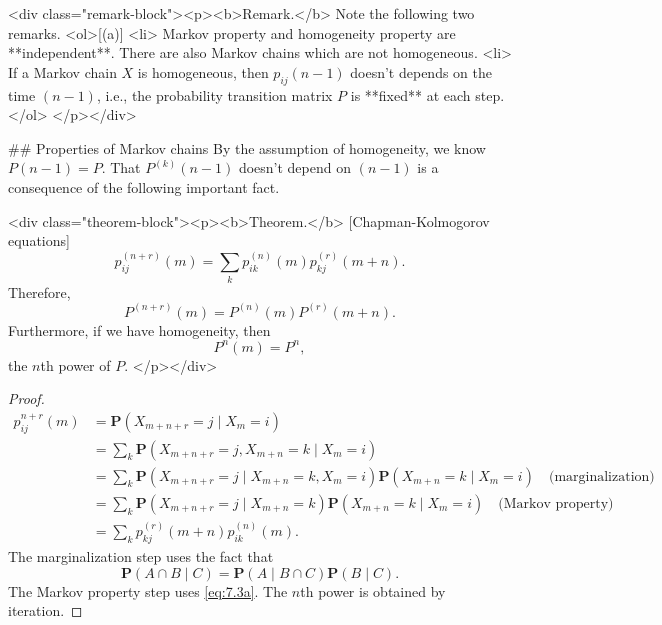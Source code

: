 <div class="remark-block"><p><b>Remark.</b> 
Note the following two remarks.
<ol>[(a)]
    <li> Markov property and homogeneity property are **independent**. There are also Markov chains which are not homogeneous. 
    <li> If a Markov chain $X$ is homogeneous, then $p_{ij}(n-1)$ doesn't depends on the time $(n-1)$, i.e., the probability transition matrix $P$ is **fixed** at each step.
</ol>
</p></div>

## Properties of Markov chains
By the assumption of homogeneity, we know $P(n-1) = P$. That $P^{(k)}(n-1)$ doesn't depend on $(n-1)$ is a consequence of the following important fact.

<div class="theorem-block"><p><b>Theorem.</b> [Chapman-Kolmogorov equations]
$$\begin{equation}
    p_{ij}^{(n+r)}(m) = \sum_{k} p_{ik}^{(n)}(m) p_{kj}^{(r)}(m+n).
\end{equation}$$
Therefore, 
$$\begin{equation}
    P^{(n+r)}(m) = P^{(n)}(m) P^{(r)}(m+n).
\end{equation}$$
Furthermore, if we have homogeneity, then 
$$\begin{equation}
    P^{n}(m) = P^n,
\end{equation}$$
the $n$th power of $P$.
</p></div>

\begin{proof}
    $$\begin{equation}
        \begin{split}
            p_{ij}^{n+r}(m) &= \mathbf{P}(X_{m+n+r} = j \;\vert\; X_m = i) \\ 
            &= \sum_{k} \mathbf{P}(X_{m+n+r} = j, X_{m+n} = k \;\vert\; X_m = i) \\
            &= \sum_{k} \mathbf{P}(X_{m+n+r} = j \;\vert\; X_{m+n} = k, X_m = i) \mathbf{P}(X_{m+n} = k \;\vert\; X_m = i) \quad \text{(marginalization)} \\
            &= \sum_{k} \mathbf{P}(X_{m+n+r} = j \;\vert\; X_{m+n} = k) \mathbf{P}(X_{m+n} = k \;\vert\; X_m = i) \quad \text{(Markov property)} \\
            &= \sum_{k} p_{kj}^{(r)}(m+n) p_{ik}^{(n)}(m) . 
        \end{split}
    \end{equation}$$
    The marginalization step uses the fact that 
    $$\begin{equation}
        \mathbf{P}(A \cap B \;\vert\; C) = \mathbf{P}(A \;\vert\; B \cap C) \mathbf{P}(B \;\vert\; C).
    \end{equation}$$
    The Markov property step uses \eqref{eq:7.3a}. The $n$th power is obtained by iteration.
\end{proof}

